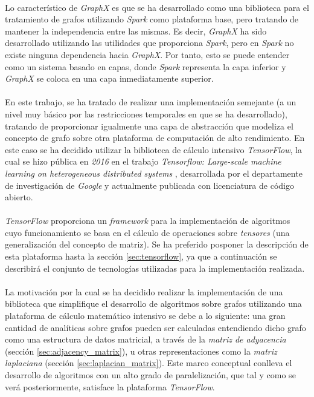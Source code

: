 \documentclass{subfiles}
\begin{document}
      \paragraph{}
      Lo característico de \emph{GraphX} es que se ha desarrollado como una biblioteca para el tratamiento de grafos utilizando \emph{Spark} como plataforma base, pero tratando de mantener la independencia entre las mismas. Es decir, \emph{GraphX} ha sido desarrollado utilizando las utilidades que proporciona \emph{Spark}, pero en \emph{Spark} no existe ninguna dependencia hacia \emph{GraphX}. Por tanto, esto se puede entender como un sistema basado en capas, donde \emph{Spark} representa la capa inferior y \emph{GraphX} se coloca en una capa inmediatamente superior.

      \paragraph{}
      En este trabajo, se ha tratado de realizar una implementación semejante (a un nivel muy básico por las restricciones temporales en que se ha desarrollado), tratando de proporcionar igualmente una capa de abstracción que modeliza el concepto de grafo sobre otra plataforma de computación de alto rendimiento. En este caso se ha decidido utilizar la biblioteca de cálculo intensivo \emph{TensorFlow}, la cual se hizo pública en \emph{2016} en el trabajo \emph{Tensorflow: Large-scale machine learning on heterogeneous distributed systems} \cite{abadi2016tensorflow}, desarrollada por el departamente de investigación de \emph{Google} y actualmente publicada con licenciatura de código abierto.

      \paragraph{}
      \emph{TensorFlow} proporciona un \emph{framework} para la implementación de algoritmos cuyo funcionamiento se basa en el cálculo de operaciones sobre \emph{tensores} (una generalización del concepto de matriz). Se ha preferido posponer la descripción de esta plataforma hasta la sección \ref{sec:tensorflow}, ya que a continuación se describirá el conjunto de tecnologías utilizadas para la implementación realizada.

      \paragraph{}
      La motivación por la cual se ha decidido realizar la implementación de una biblioteca que simplifique el desarrollo de algoritmos sobre grafos utilizando una plataforma de cálculo matemático intensivo se debe a lo siguiente: una gran cantidad de analíticas sobre grafos pueden ser calculadas entendiendo dicho grafo como una estructura de datos matricial, a través de la \emph{matriz de adyacencia} (sección \ref{sec:adjacency_matrix}), u otras representaciones como la \emph{matriz laplaciana} (sección \ref{sec:laplacian_matrix}). Este marco conceptual conlleva el desarrollo de algoritmos con un alto grado de paralelización, que tal y como se verá posteriormente, satisface la plataforma \emph{TensorFlow}.
\end{document}
